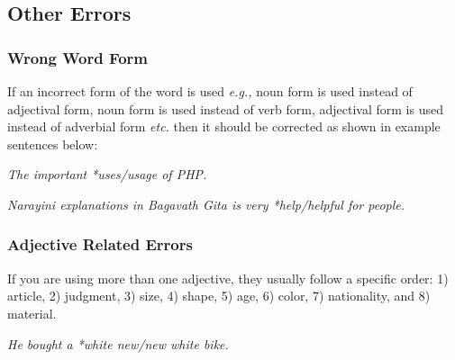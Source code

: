 \documentclass[12pt]{article}
\begin{document}
\subsection{Other Errors}

\subsubsection{Wrong Word Form}
If an incorrect form of the word is used {\it e.g.,} noun form is used instead of adjectival form, noun form is used instead of verb form, adjectival form is used instead of adverbial form {\it etc.} then it should be corrected as shown in example sentences below:

{\it The important *uses/usage of PHP.}

{\it Narayini explanations in Bagavath Gita is very *help/helpful for people.} 


\subsubsection{Adjective Related Errors}

If you are using more than one adjective, they usually follow a specific order: 1) article, 2) judgment, 3) size, 4) shape, 5) age, 6) color, 7) nationality, and 8) material. 

{\it He bought a *white new/new white bike.}

\end{document}
